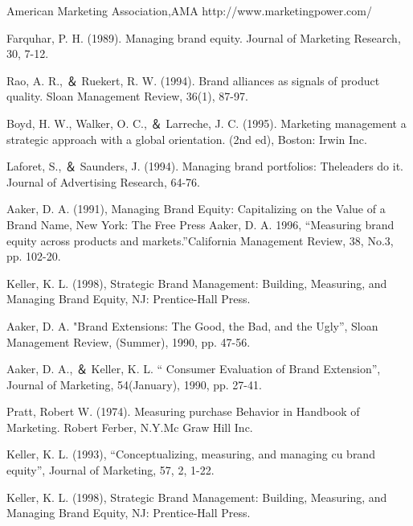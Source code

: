 \documentclass[a4paper,12pt]{report}
\begin{document}
\begin{thebibliography}{1}


American Marketing Association,AMA http://www.marketingpower.com/


Farquhar, P. H. (1989). Managing brand equity. Journal of Marketing Research, 30, 7-12.

Rao, A. R., ＆ Ruekert, R. W. (1994). Brand alliances as signals of product quality. Sloan Management Review, 36(1), 87-97.

Boyd, H. W., Walker, O. C., ＆ Larreche, J. C. (1995). Marketing management a
strategic approach with a global orientation. (2nd ed), Boston: Irwin Inc.

Laforet, S., ＆ Saunders, J. (1994). Managing brand portfolios: Theleaders do it. Journal of Advertising Research, 64-76.

Aaker, D. A. (1991), Managing Brand Equity: Capitalizing on the Value of a Brand Name, New
York: The Free Press
Aaker, D. A. 1996, “Measuring brand equity across products and markets.”California Management Review, 38, No.3, pp. 102-20.

Keller, K. L. (1998), Strategic Brand Management: Building, Measuring, and Managing
Brand Equity, NJ: Prentice-Hall Press.

Aaker, D. A. "Brand Extensions: The Good, the Bad, and the Ugly”, Sloan 
Management Review, (Summer), 1990, pp. 47-56. 

Aaker, D. A.,  ＆ Keller, K. L. “
Consumer Evaluation of Brand Extension”, 
Journal of Marketing, 54(January), 1990, pp. 27-41.

Pratt, Robert W. (1974). Measuring purchase Behavior in Handbook of Marketing. Robert Ferber, N.Y.Mc Graw Hill Inc.

Keller, K. L. (1993), “Conceptualizing, measuring, and managing cu
brand equity”, Journal of Marketing, 57, 2, 1-22. 

Keller, K. L. (1998), Strategic Brand Management: Building, Measuring, and Managing
Brand Equity, NJ: Prentice-Hall Press.


\end{thebibliography}
\end{document}

